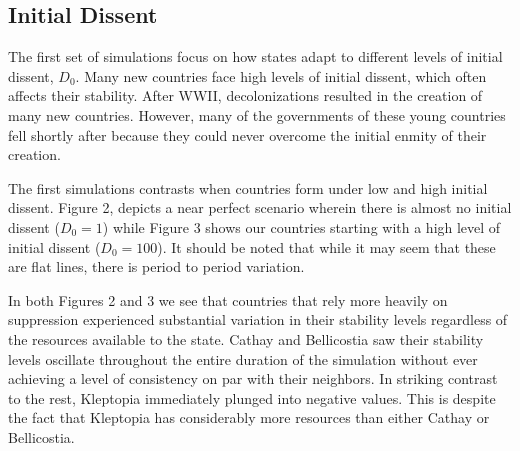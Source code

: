 \documentclass[12pt]{article}
\begin{document}
\begin{spacing}{1.5}
\subsection{Initial Dissent}


The first set of simulations focus on how states adapt to different levels of initial dissent, $D_0$. Many new countries face high levels of initial dissent, which often affects their stability. After WWII, decolonizations resulted in the creation of many new countries. However, many of the governments of these young countries fell shortly after because they could never overcome the initial enmity of their creation. 

The first simulations contrasts when countries form under low and high initial dissent. Figure 2, depicts a near perfect scenario wherein there is almost no initial dissent ($D_0 = 1$) while Figure 3 shows our countries starting with a high level of initial dissent ($D_0 = 100$). It should be noted that while it may seem that these are flat lines, there is period to period variation.  

In both Figures 2 and 3 we see that countries that rely more heavily on suppression experienced substantial variation in their stability levels regardless of the resources available to the state. Cathay and Bellicostia saw their stability levels oscillate throughout the entire duration of the simulation without ever achieving a level of consistency on par with their neighbors. In striking contrast to the rest, Kleptopia immediately plunged into negative values. This is despite the fact that Kleptopia has considerably more resources than either Cathay or Bellicostia. 


\end{spacing}
\end{document}
